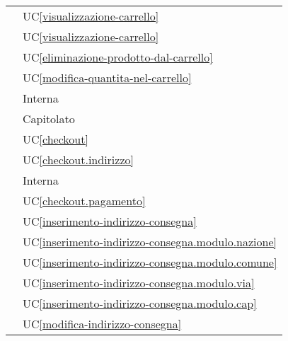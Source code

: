 \begin{longtable}{C{6cm} C{6cm}}
     & UC\ref{visualizzazione-carrello} \\

     & UC\ref{visualizzazione-carrello} \\

     & UC\ref{eliminazione-prodotto-dal-carrello} \\

     & UC\ref{modifica-quantita-nel-carrello} \\

     & Interna \\

     & Capitolato \\

     & UC\ref{checkout} \\

     & UC\ref{checkout.indirizzo} \\

     & Interna \\

     & UC\ref{checkout.pagamento} \\

     & UC\ref{inserimento-indirizzo-consegna} \\

     & UC\ref{inserimento-indirizzo-consegna.modulo.nazione} \\

     & UC\ref{inserimento-indirizzo-consegna.modulo.comune} \\

     & UC\ref{inserimento-indirizzo-consegna.modulo.via} \\

     & UC\ref{inserimento-indirizzo-consegna.modulo.cap} \\

     & UC\ref{modifica-indirizzo-consegna} \\


\end{longtable}
